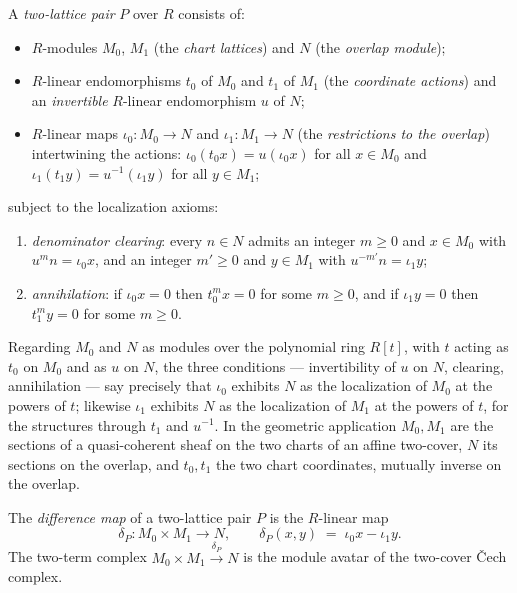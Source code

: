 \begin{definition}
  \label{def:twoLatticePair}
  \leanok
  A \emph{two-lattice pair} \(P\) over \(R\) consists of:
  \begin{itemize}
    \item \(R\)-modules \(M_0\), \(M_1\) (the \emph{chart lattices}) and \(N\) (the
      \emph{overlap module});
    \item \(R\)-linear endomorphisms \(t_0\) of \(M_0\) and \(t_1\) of \(M_1\) (the
      \emph{coordinate actions}) and an \emph{invertible} \(R\)-linear endomorphism
      \(u\) of \(N\);
    \item \(R\)-linear maps \(\iota_0 : M_0 \to N\) and \(\iota_1 : M_1 \to N\) (the
      \emph{restrictions to the overlap}) intertwining the actions:
      \(\iota_0(t_0 x) = u(\iota_0 x)\) for all \(x \in M_0\) and
      \(\iota_1(t_1 y) = u^{-1}(\iota_1 y)\) for all \(y \in M_1\);
  \end{itemize}
  subject to the localization axioms:
  \begin{enumerate}
    \item \emph{denominator clearing}: every \(n \in N\) admits an integer \(m \ge 0\)
      and \(x \in M_0\) with \(u^m n = \iota_0 x\), and an integer \(m' \ge 0\) and
      \(y \in M_1\) with \(u^{-m'} n = \iota_1 y\);
    \item \emph{annihilation}: if \(\iota_0 x = 0\) then \(t_0^m x = 0\) for some
      \(m \ge 0\), and if \(\iota_1 y = 0\) then \(t_1^m y = 0\) for some \(m \ge 0\).
  \end{enumerate}
  Regarding \(M_0\) and \(N\) as modules over the polynomial ring \(R[t]\), with \(t\)
  acting as \(t_0\) on \(M_0\) and as \(u\) on \(N\), the three conditions ---
  invertibility of \(u\) on \(N\), clearing, annihilation --- say precisely that
  \(\iota_0\) exhibits \(N\) as the localization of \(M_0\) at the powers of \(t\);
  likewise \(\iota_1\) exhibits \(N\) as the localization of \(M_1\) at the powers of
  \(t\), for the structures through \(t_1\) and \(u^{-1}\). In the geometric application
  \(M_0, M_1\) are the sections of a quasi-coherent sheaf on the two charts of an affine
  two-cover, \(N\) its sections on the overlap, and \(t_0, t_1\) the two chart
  coordinates, mutually inverse on the overlap.
\end{definition}

\begin{definition}
  \label{def:twoLattice_diff}
  \leanok
  The \emph{difference map} of a two-lattice pair \(P\) is the \(R\)-linear map
  \[
    \delta_P : M_0 \times M_1 \longrightarrow N, \qquad
    \delta_P(x, y) \;=\; \iota_0 x - \iota_1 y .
  \]
  The two-term complex \(M_0 \times M_1 \xrightarrow{\ \delta_P\ } N\) is the module
  avatar of the two-cover \v{C}ech complex.
\end{definition}

